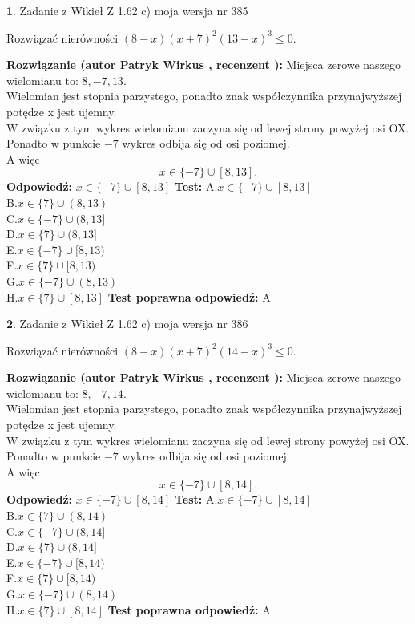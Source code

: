 \documentclass[12pt, a4paper]{article}
\theoremstyle{definition} %
\newtheorem{zad}{}
\newcommand{\zadStart}[1]{\begin{zad}#1\newline}
\newcommand{\zadStop}{\end{zad}}
\newcommand{\rozwStart}[2]{\noindent \textbf{Rozwiązanie (autor #1 , recenzent #2): }\newline}
\newcommand{\rozwStop}{\newline}
\newcommand{\odpStart}{\noindent \textbf{Odpowiedź:}\newline}
\newcommand{\odpStop}{\newline}
\newcommand{\testStart}{\noindent \textbf{Test:}\newline}
\newcommand{\testStop}{\newline}
\newcommand{\kluczStart}{\noindent \textbf{Test poprawna odpowiedź:}\newline}
\newcommand{\kluczStop}{\newline}
\begin{document}
\zadStart{Zadanie z Wikieł Z 1.62 c) moja wersja nr 385}

Rozwiązać nierówności $(8-x)(x+7)^{2}(13-x)^{3}\le0$.
\zadStop
\rozwStart{Patryk Wirkus}{}
Miejsca zerowe naszego wielomianu to: $8, -7, 13$.\\
Wielomian jest stopnia parzystego, ponadto znak współczynnika przy\linebreak najwyższej potędze x jest ujemny.\\ W związku z tym wykres wielomianu zaczyna się od lewej strony powyżej osi OX.\\
Ponadto w punkcie $-7$ wykres odbija się od osi poziomej.\\
A więc $$x \in \{-7\} \cup [8,13].$$
\rozwStop
\odpStart
$x \in \{-7\} \cup [8,13]$
\odpStop
\testStart
A.$x \in \{-7\} \cup [8,13]$\\
B.$x \in \{7\} \cup (8,13)$\\
C.$x \in \{-7\} \cup (8,13]$\\
D.$x \in \{7\} \cup (8,13]$\\
E.$x \in \{-7\} \cup [8,13)$\\
F.$x \in \{7\} \cup [8,13)$\\
G.$x \in \{-7\} \cup (8,13)$\\
H.$x \in \{7\} \cup [8,13]$
\testStop
\kluczStart
A
\kluczStop



\zadStart{Zadanie z Wikieł Z 1.62 c) moja wersja nr 386}

Rozwiązać nierówności $(8-x)(x+7)^{2}(14-x)^{3}\le0$.
\zadStop
\rozwStart{Patryk Wirkus}{}
Miejsca zerowe naszego wielomianu to: $8, -7, 14$.\\
Wielomian jest stopnia parzystego, ponadto znak współczynnika przy\linebreak najwyższej potędze x jest ujemny.\\ W związku z tym wykres wielomianu zaczyna się od lewej strony powyżej osi OX.\\
Ponadto w punkcie $-7$ wykres odbija się od osi poziomej.\\
A więc $$x \in \{-7\} \cup [8,14].$$
\rozwStop
\odpStart
$x \in \{-7\} \cup [8,14]$
\odpStop
\testStart
A.$x \in \{-7\} \cup [8,14]$\\
B.$x \in \{7\} \cup (8,14)$\\
C.$x \in \{-7\} \cup (8,14]$\\
D.$x \in \{7\} \cup (8,14]$\\
E.$x \in \{-7\} \cup [8,14)$\\
F.$x \in \{7\} \cup [8,14)$\\
G.$x \in \{-7\} \cup (8,14)$\\
H.$x \in \{7\} \cup [8,14]$
\testStop
\kluczStart
A
\kluczStop
\end{document}
